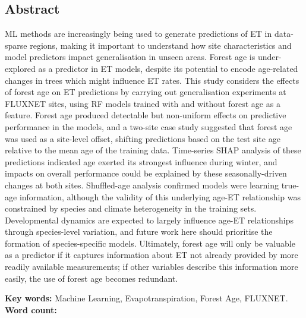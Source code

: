 \begin{titlepage}
	\section*{Abstract} 	
	\normalfont \normalsize
	 \ac{ML} methods are increasingly being used to generate predictions of \ac{ET} in data-sparse regions, making it important to understand how site characteristics and model predictors impact generalisation in unseen areas. Forest age is under-explored as a predictor in \ac{ET} models, despite its potential to encode age-related changes in trees which might influence \ac{ET} rates. This study considers the effects of forest age on \ac{ET} predictions by carrying out generalisation experiments at FLUXNET sites, using \ac{RF} models trained with and without forest age as a feature. Forest age produced detectable but non-uniform effects on predictive performance in the models, and a two-site case study suggested that forest age was used as a site-level offset, shifting predictions based on the test site age relative to the mean age of the training data. Time-series \acs{SHAP} analysis of these predictions indicated age exerted its strongest influence during winter, and impacts on overall performance could be explained by these seasonally-driven changes at both sites. Shuffled-age analysis confirmed models were learning true-age information, although the validity of this underlying age-ET relationship was constrained by species and climate heterogeneity in the training sets. Developmental dynamics are expected to largely influence age-ET relationships through species-level variation, and future work here should prioritise the formation of species-specific models. Ultimately, forest age will only be valuable as a predictor if it captures information about ET not already provided by more readily available measurements; if other variables describe this information more easily, the use of forest age becomes redundant.
	\vspace{3em}
	
	\noindent\textbf{Key words:} Machine Learning, Evapotranspiration, Forest Age, FLUXNET. \\
	\noindent\textbf{Word count:} \wordcountresulttotal\\
	
	\vspace*{\fill}
	

	
	
	\vspace{2em}
\end{titlepage}


